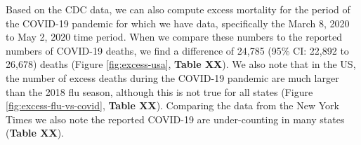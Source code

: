 \documentclass[11pt]{article}
\begin{document}

Based on the CDC data, we can also compute excess mortality for the period of the COVID-19 pandemic for which we have data, specifically the March 8, 2020 to May 2, 2020 time period. When we compare these numbers to the reported numbers of COVID-19 deaths, we find a difference of 24,785 (95\% CI: 22,892 to 26,678) deaths (Figure \ref{fig:excess-usa}, \textbf{Table XX}). We also note that in the US, the number of excess deaths during the COVID-19 pandemic are much larger than the 2018 flu season, although this is not true for all states (Figure \ref{fig:excess-flu-vs-covid}, \textbf{Table XX}). Comparing the data from the New York Times \cite{smith2020coronavirus} we also note the reported COVID-19 are under-counting in many states (\textbf{Table XX}).
\end{document}
